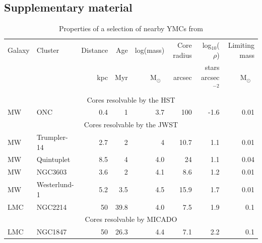 \documentclass{aa}
\newcommand{\msun}{M$_\odot$~}
\newcommand{\h}[1]{$^{#1}$}
\begin{document}
\begin{appendix}

\section{Supplementary material}
\label{sec:appendix}

\begin{table}
    \centering
    \caption{Properties of a selection of nearby YMCs from \citet{portegies2010}}
    \label{tbl:pz10_selection}
    \begin{tabular}{l l r r r r r r}
        \hline\hline
        Galaxy & Cluster      & Distance & Age  & log(mass) & Core radius & log$_{10}$($\rho$)    & Limiting mass \\
              &              & kpc      & Myr  & \msun     & arcsec  & stars arcsec\h{-2} & \msun         \\
        \hline
        \multicolumn{8}{c}{Cores resolvable by the HST}                                                     \\
        \hline
        MW     & ONC          & 0.4      & 1    & 3.7       & 100     & -1.6           & 0.01          \\
        \hline
        \multicolumn{8}{c}{Cores resolvable by the JWST}                                                    \\
        \hline
        MW     & Trumpler-14  & 2.7      & 2    & 4         & 10.7    & 1.1            & 0.01          \\
        MW     & Quintuplet   & 8.5      & 4    & 4.0       & 24      & 1.1            & 0.04          \\
        MW     & NGC3603      & 3.6      & 2    & 4.1       & 8.6     & 1.2            & 0.01          \\
        MW     & Westerlund-1 & 5.2      & 3.5  & 4.5       & 15.9    & 1.7            & 0.01          \\
        LMC    & NGC2214      & 50       & 39.8 & 4.0       & 7.5     & 1.9            & 0.1           \\
        \hline
        \multicolumn{8}{c}{Cores resolvable by MICADO}                                                  \\
        \hline
        LMC    & NGC1847      & 50       & 26.3 & 4.4       & 7.1     & 2.2            & 0.1           \\

\end{tabular}
\end{table}
\end{appendix}
\end{document}
